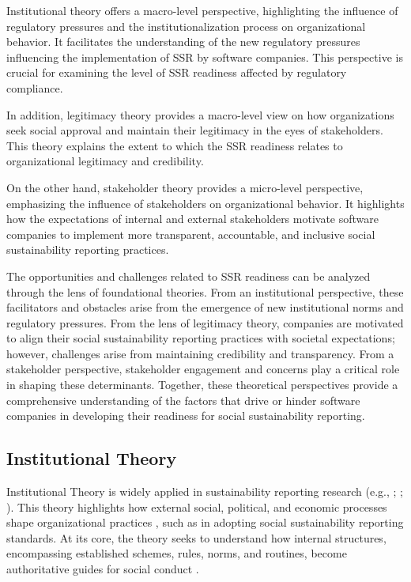 Institutional theory offers a macro-level perspective, highlighting the influence of 
regulatory pressures and the institutionalization process on organizational behavior. 
It facilitates the understanding of the new regulatory pressures influencing the implementation 
of SSR by software companies. This perspective is crucial for examining the level of SSR readiness 
affected by regulatory compliance.

In addition, legitimacy theory provides a macro-level view on how organizations seek 
social approval and maintain their legitimacy in the eyes of stakeholders. This theory explains 
the extent to which the SSR readiness relates to organizational legitimacy and credibility.

On the other hand, stakeholder theory provides a micro-level perspective, emphasizing the influence 
of stakeholders on organizational behavior. It highlights how the expectations of internal and external 
stakeholders motivate software companies to implement more transparent, accountable, and inclusive social 
sustainability reporting practices.

The opportunities and challenges related to SSR readiness can be analyzed through the lens of foundational 
theories. From an institutional perspective, these facilitators and obstacles arise from the emergence of 
new institutional norms and regulatory pressures. From the lens of legitimacy theory, companies are 
motivated to align their social sustainability reporting practices with societal expectations; however, 
challenges arise from maintaining credibility and transparency. From a stakeholder perspective, stakeholder 
engagement and concerns play a critical role in shaping these determinants. Together, these theoretical 
perspectives provide a comprehensive understanding of the factors that drive or hinder software companies 
in developing their readiness for social sustainability reporting.


\subsection{Institutional Theory}
Institutional Theory is widely applied in sustainability 
reporting research (e.g., \citeauthor{Campbell2007} \citeyear{Campbell2007}; \citeauthor{Nikolaeva2010} \citeyear{Nikolaeva2010};
\citeauthor{Shabana2017} \citeyear{Shabana2017}). This theory  highlights how external social, 
political, and economic processes shape organizational practices \parencite{Meyer1977}, 
such as in adopting social sustainability reporting standards.
At its core, the theory seeks to understand how internal structures, 
encompassing established schemes, rules, norms, and routines, become authoritative guides for social 
conduct \parencite{Dimaggio1983, Meyer1977, Greenwood1996}.

